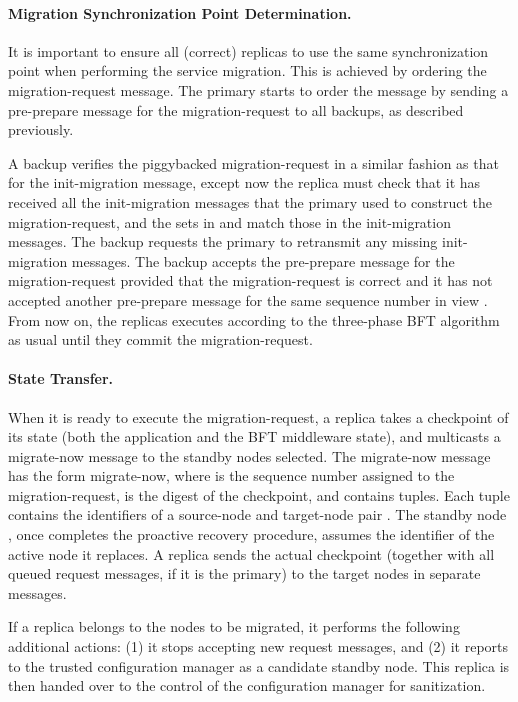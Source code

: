 \documentclass[times, 10pt, twocolumn]{article}
\begin{document}
\paragraph{Migration Synchronization Point Determination.}
It is important to ensure all (correct) replicas to use the same 
synchronization point when performing the service migration. This is
achieved by ordering the {\sc migration-request} message. 
The primary starts to order the message by sending a {\sc pre-prepare} 
message for the {\sc migration-request} to all backups, as described 
previously. 

A backup verifies the piggybacked {\sc migration-request} in a similar fashion
as that for the {\sc init-migration} message, except now the replica must check
that it has received all the  init-migration messages that the
primary used to construct the {\sc migration-request}, and the sets in
  and  match those in the {\sc init-migration} messages. The backup
requests the primary to retransmit any missing {\sc init-migration} messages.
The backup accepts the {\sc pre-prepare} message for the 
{\sc migration-request} provided that the {\sc migration-request} is correct 
and it has not accepted another {\sc pre-prepare} message for the same 
sequence number in view . From now on, the replicas executes according to 
the three-phase BFT algorithm~\cite{bft-acm} as usual 
until they commit the {\sc migration-request}.

\paragraph{State Transfer.}
When it is ready to execute the {\sc migration-request}, a replica  takes 
a checkpoint of its state (both the application and the BFT middleware state), 
and multicasts a {\sc migrate-now} message to the  standby nodes selected. 
The {\sc migrate-now} message has the form 
{\sc migrate-now}, where  is 
the sequence number assigned to the {\sc migration-request},
 is the digest of the checkpoint, and  contains  tuples. 
Each tuple contains the identifiers of a source-node and target-node pair 
. The standby node , once completes the proactive recovery 
procedure, assumes the identifier  of the active node it replaces.
A replica sends the actual checkpoint (together with all queued request 
messages, if it is the primary) to the target nodes in separate messages.

If a replica belongs to the  nodes to be migrated, it performs the
following additional actions:
(1) it stops accepting new request messages, and 
(2) it reports to the trusted configuration manager as a candidate standby 
node.
This replica is then handed over to the control of the configuration
manager for sanitization.
\end{document}
